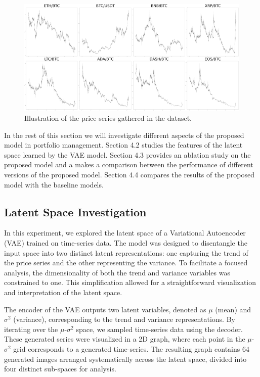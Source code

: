 \begin{figure}[h]
	\centering
	\includegraphics[scale=0.55]{./dataset.png}
	\caption{Illustration of the price series gathered in the dataset.}
	\label{fig:dataset}
\end{figure}



In the rest of this section we will investigate different aspects of the proposed model in portfolio management. Section 4.2 studies the features of the latent space learned by the VAE model. Section 4.3 provides an ablation study on the proposed model and a makes a comparison between the performance of different versions of the proposed model. Section 4.4 compares the results of the proposed model with the baseline models.

\subsection{Latent Space Investigation}
In this experiment, we explored the latent space of a Variational Autoencoder (VAE) trained on time-series data. The model was designed to disentangle the input space into two distinct latent representations: one capturing the trend of the price series and the other representing the variance. To facilitate a focused analysis, the dimensionality of both the trend and variance variables was constrained to one. This simplification allowed for a straightforward visualization and interpretation of the latent space.

The encoder of the VAE outputs two latent variables, denoted as $\mu$ (mean) and $\sigma^2$ (variance), corresponding to the trend and variance representations. By iterating over the $\mu$-$\sigma^2$ space, we sampled time-series data using the decoder. These generated series were visualized in a 2D graph, where each point in the $\mu$-$\sigma^2$ grid corresponds to a generated time-series. The resulting graph contains 64 generated images arranged systematically across the latent space, divided into four distinct sub-spaces for analysis.

